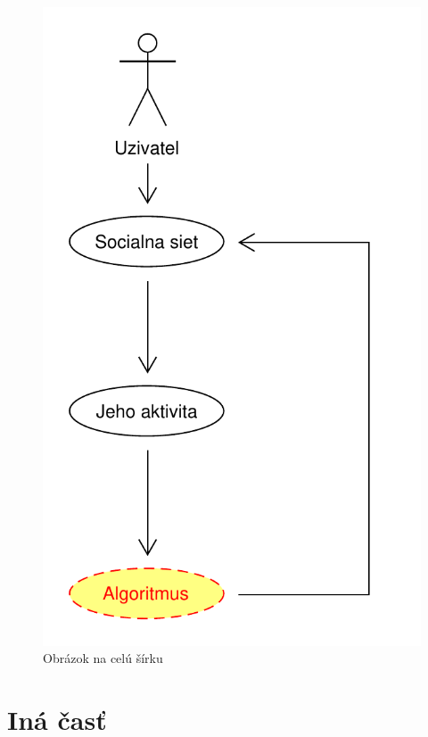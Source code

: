 \documentclass[10pt,twoside,slovak,a4paper]{article}
\begin{document}
\begin{multicols}{2}

\begin{figure}[H]
      \centering
      \includegraphics[width= 2\linewidth]{diagram2.pdf}
      \caption{Obrázok na celú šírku}
      \label{fig:obrazok1}
\end{figure}

\end{multicols}

\section{Iná časť} \label{ina}
\end{document}
